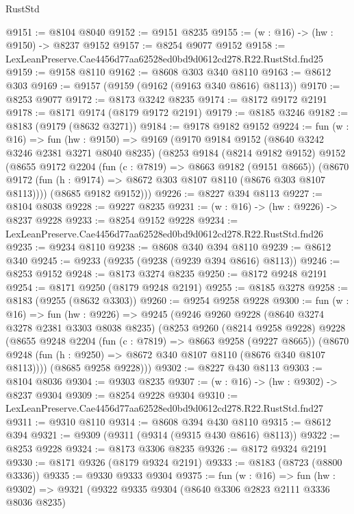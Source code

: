\begin{lexlean}{RustStd}
\begin{coremodule}
@9151 := @8104 @8040
@9152 := @9151 @8235
@9155 := (w : @16) -> (hw : @9150) -> @8237 @9152
@9157 := @8254 @9077 @9152
@9158 := LexLeanPreserve.Cae4456d77aa62528ed0bd9d0612cd278.R22.RustStd.fnd25
@9159 := @9158 @8110
@9162 := @8608 @303 @340 @8110
@9163 := @8612 @303
@9169 := @9157 (@9159 (@9162 (@9163 @340 @8616) @8113))
@9170 := @8253 @9077
@9172 := @8173 @3242 @8235
@9174 := @8172 @9172 @2191
@9178 := @8171 @9174 (@8179 @9172 @2191)
@9179 := @8185 @3246
@9182 := @8183 (@9179 (@8632 @3271))
@9184 := @9178 @9182 @9152
@9224 := fun (w : @16) =>
  fun (hw : @9150) =>
  @9169
    (@9170
      @9184
      @9152
      (@8640 @3242 @3246 @2381 @3271 @8040 @8235)
      (@8253
        @9184
        (@8214 @9182 @9152)
        @9152
        (@8655
          @9172
          @2204
          (fun (c : @7819) => @8663 @9182 (@9151 @8665))
          (@8670 @9172 (fun (h : @9174) => @8672 @303 @8107 @8110 (@8676 @303 @8107 @8113))))
        (@8685 @9182 @9152)))
@9226 := @8227 @394 @8113
@9227 := @8104 @8038
@9228 := @9227 @8235
@9231 := (w : @16) -> (hw : @9226) -> @8237 @9228
@9233 := @8254 @9152 @9228
@9234 := LexLeanPreserve.Cae4456d77aa62528ed0bd9d0612cd278.R22.RustStd.fnd26
@9235 := @9234 @8110
@9238 := @8608 @340 @394 @8110
@9239 := @8612 @340
@9245 := @9233 (@9235 (@9238 (@9239 @394 @8616) @8113))
@9246 := @8253 @9152
@9248 := @8173 @3274 @8235
@9250 := @8172 @9248 @2191
@9254 := @8171 @9250 (@8179 @9248 @2191)
@9255 := @8185 @3278
@9258 := @8183 (@9255 (@8632 @3303))
@9260 := @9254 @9258 @9228
@9300 := fun (w : @16) =>
  fun (hw : @9226) =>
  @9245
    (@9246
      @9260
      @9228
      (@8640 @3274 @3278 @2381 @3303 @8038 @8235)
      (@8253
        @9260
        (@8214 @9258 @9228)
        @9228
        (@8655
          @9248
          @2204
          (fun (c : @7819) => @8663 @9258 (@9227 @8665))
          (@8670 @9248 (fun (h : @9250) => @8672 @340 @8107 @8110 (@8676 @340 @8107 @8113))))
        (@8685 @9258 @9228)))
@9302 := @8227 @430 @8113
@9303 := @8104 @8036
@9304 := @9303 @8235
@9307 := (w : @16) -> (hw : @9302) -> @8237 @9304
@9309 := @8254 @9228 @9304
@9310 := LexLeanPreserve.Cae4456d77aa62528ed0bd9d0612cd278.R22.RustStd.fnd27
@9311 := @9310 @8110
@9314 := @8608 @394 @430 @8110
@9315 := @8612 @394
@9321 := @9309 (@9311 (@9314 (@9315 @430 @8616) @8113))
@9322 := @8253 @9228
@9324 := @8173 @3306 @8235
@9326 := @8172 @9324 @2191
@9330 := @8171 @9326 (@8179 @9324 @2191)
@9333 := @8183 (@8723 (@8800 @3336))
@9335 := @9330 @9333 @9304
@9375 := fun (w : @16) =>
  fun (hw : @9302) =>
  @9321
    (@9322
      @9335
      @9304
      (@8640 @3306 @2823 @2111 @3336 @8036 @8235)

\end{coremodule}
\end{lexlean}
